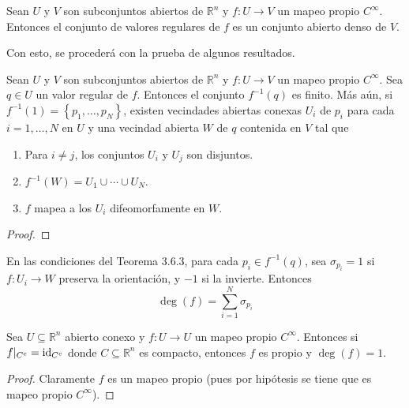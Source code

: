 \documentclass[12pt]{report}
\theoremstyle{largebreak}
\newcommand\cf[3]{\ensuremath{#1:#2\rightarrow#3}}
\begin{document}
\setcounter{section}{6}
\setcounter{theor}{1}

\begin{theor}[Sard]
    Sean $U$ y $V$ son subconjuntos abiertos de $\mathbb{R}^n$ y $\cf{f}{U}{V}$ un mapeo propio $C^\infty$. Entonces el conjunto de valores regulares de $f$ es un conjunto abierto denso de $V$.
\end{theor}

Con esto, se procederá con la prueba de algunos resultados.

\begin{theor}
    Sean $U$ y $V$ son subconjuntos abiertos de $\mathbb{R}^n$ y $\cf{f}{U}{V}$ un mapeo propio $C^\infty$. Sea $q\in U$ un valor regular de $f$. Entonces el conjunto $f^{-1}(q)$ es finito. Más aún, si $f^{-1}(1)=\left\{p_1,\dots,p_N\right\}$, existen vecindades abiertas conexas $U_i$ de $p_i$ para cada $i=1,\dots,N$ en $U$ y una vecindad abierta $W$ de $q$ contenida en $V$ tal que
    \begin{enumerate}
        \item Para $i\neq j$, los conjuntos $U_i$ y $U_j$ son disjuntos.
        \item $f^{-1}(W)=U_1\cup\cdots\cup U_N$.
        \item $f$ mapea a los $U_i$ difeomorfamente en $W$. 
    \end{enumerate}
\end{theor}

\begin{proof}
    
\end{proof}

\begin{theor}
    En las condiciones del Teorema 3.6.3, para cada $p_i\in f^{-1}(q)$, sea $\sigma_{p_i}=1$ si $\cf{f}{U_i}{W}$ preserva la orientación, y $-1$ si la invierte. Entonces
    \begin{equation*}
        \deg(f)=\sum_{i=1}^{N}\sigma_{p_i}
    \end{equation*}
\end{theor}

\begin{propo}
    Sea $U\subseteq \mathbb{R}^n$ abierto conexo y $\cf{f}{U}{U}$ un mapeo propio $C^{\infty}$. Entonces si $f|_{C^c}=\textup{id}_{C^c}$ donde $C\subseteq\mathbb{R}^n$ es compacto, entonces $f$ es propio y $\deg(f)=1$.
\end{propo}

\begin{proof}
    Claramente $f$ es un mapeo propio (pues por hipótesis se tiene que es mapeo propio $C^\infty$).
\end{proof}
\end{document}
